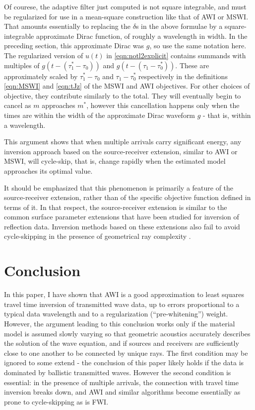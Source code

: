 Of courese, the adaptive filter just computed is not square
integrable, and must be regularized for use in a mean-square
construction like that of AWI or MSWI. That amounts essentially to
replacing the $\delta$s in the above formulae by a square-integrable
approximate Dirac function, of roughly a wavelength in width. In the
preceding section, this approximate Dirac was $g$, so use the same
notation here. The regularized version of $u(t)$ in
\ref{eqn:notl2explicit} contains summands with multiples of $g(t-(\tau^*_1-\tau_0))$
and $g(t-(\tau_1-\tau^*_0))$. These are approximately scaled by
$\tau^*_1-\tau_0$ and $\tau_1-\tau^*_0$ respectively in the
definitions \ref{eqn:MSWI} and \ref{eqn:tJz} of the MSWI and AWI
objectives. For other choices of objective, they contribute similarly
to the total. They will eventually begin to cancel as $m$ approaches
$m^*$, however this cancellation happens only when the times are
within the width of the approximate 
Dirac waveform $g$ - that is, within a wavelength.

This argument shows that when multiple arrivals carry significant energy, any
inversion approach based on the source-receiver extension, similar to
AWI or MSWI, will cycle-skip, that is, change rapidly when the
estimated model approaches its optimal value.

It should be emphasized that this phenomenon is primarily a feature of the
source-receiver extension, rather than of the specific objective
function defined in terms of it. In that respect, the source-receiver
extension is similar to the common surface parameter extensions that
have been studied for inversion of reflection data. Inversion methods
based on these extensions also fail to avoid cycle-skipping in the presence of
geometrical ray complexity \cite[]{geoprosp:2008}.

\section{Conclusion}
In this paper, I have shown that AWI is a good approximation to least
squares travel time inversion of transmitted wave data, up to errors proportional to a typical
data wavelength and to a regularization (``pre-whitening'')
weight. However, the argument leading to this conclusion works only if
the material model is assumed slowly varying so that geometric
acoustics accurately describes the solution of the wave equation, and if
sources and receivers are sufficiently close to one another to be
connected by unique rays. The first condition may be ignored to some
extend - the conclusion of this paper likely holds if the data is
dominated by ballistic transmitted waves. However the second condition
is essential: in the presence of multiple arrivals, the connection
with travel time inversion breaks down, and AWI and similar algorithms
become essentially as prone to cycle-skipping as is FWI.





